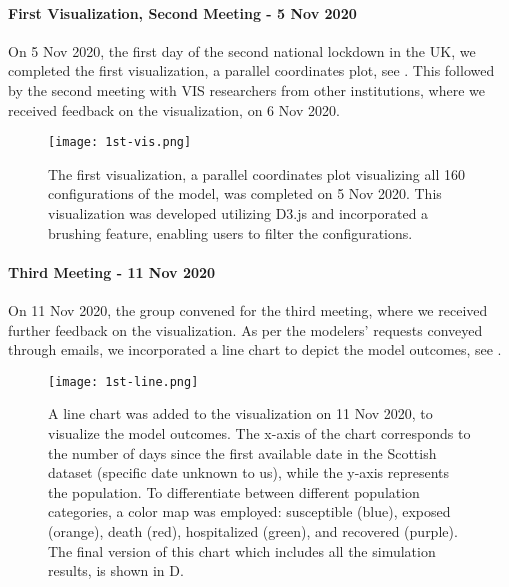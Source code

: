 \paragraph{First Visualization, Second Meeting - 5 Nov 2020}
On 5 Nov 2020, the first day of the second national lockdown in the UK, we completed the first visualization, a parallel coordinates plot, see .
This followed by the second meeting with VIS researchers from other institutions, where we received feedback on the visualization, on 6 Nov 2020.
\begin{figure}
    \centering
    \texttt{[image: 1st-vis.png]}
    \caption{The first visualization, a parallel coordinates plot visualizing all 160 configurations of the model, was completed on 5 Nov 2020. This visualization was developed utilizing D3.js and incorporated a brushing feature, enabling users to filter the configurations.
    }
    \label{fig:1st-vis}

\end{figure}

\paragraph{Third Meeting - 11 Nov 2020}
On 11 Nov 2020, the group convened for the third meeting, where we received further feedback on the visualization. As per the modelers' requests conveyed through emails, we incorporated a line chart to depict the model outcomes, see .

\begin{figure}
    \centering
    \texttt{[image: 1st-line.png]}
    \caption{A line chart was added to the visualization on 11 Nov 2020, to visualize the model outcomes.
    The x-axis of the chart corresponds to the number of days since the first available date in the Scottish dataset (specific date unknown to us), while the y-axis represents the population.
    To differentiate between different population categories, a color map was employed: susceptible (blue), exposed (orange), death (red), hospitalized (green), and recovered (purple).
    The final version of this chart which includes all the simulation results, is shown in D.
    }
    \label{fig:1st-line}

\end{figure}

